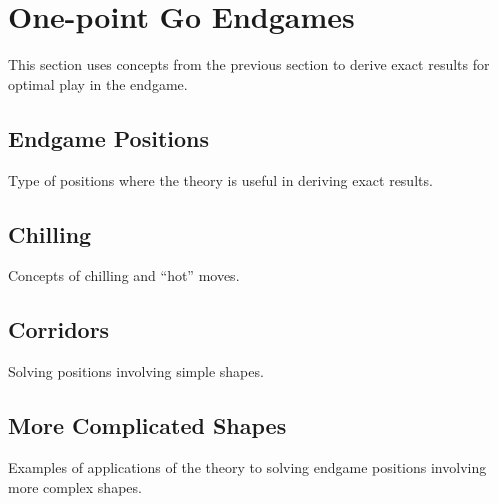 \documentclass[../math194_paper.tex]{subfiles}
\begin{document}
\section{One-point Go Endgames}
This section uses concepts from the previous section to derive exact 
results for optimal play in the endgame.

\subsection{Endgame Positions}
Type of positions where the theory is useful in deriving exact results.

\subsection{Chilling}
Concepts of chilling and ``hot'' moves.

\begin{theorem}
    
\end{theorem}

\subsection{Corridors}
Solving positions involving simple shapes.

\subsection{More Complicated Shapes}
Examples of applications of the theory to solving endgame positions 
involving more complex shapes. 
\end{document}
